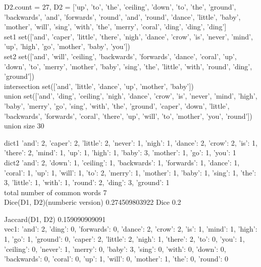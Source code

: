 \documentclass{article}
\begin{document}
D2.count = 27, D2 = ['up', 'to', 'the', 'ceiling', 'down', 'to', 'the', 'ground', 'backwards', 'and', 'forwards', 'round', 'and', 'round', 'dance', 'little', 'baby', 'mother', 'will', 'sing', 'with', 'the', 'merry', 'coral', 'ding', 'ding', 'ding'] \\

set1 set(['and', 'caper', 'little', 'there', 'nigh', 'dance', 'crow', 'is', 'never', 'mind', 'up', 'high', 'go', 'mother', 'baby', 'you']) \\

set2 set(['and', 'will', 'ceiling', 'backwards', 'forwards', 'dance', 'coral', 'up', 'down', 'to', 'merry', 'mother', 'baby', 'sing', 'the', 'little', 'with', 'round', 'ding', 'ground']) \\

intersection set(['and', 'little', 'dance', 'up', 'mother', 'baby']) \\

union set(['and', 'ding', 'ceiling', 'nigh', 'dance', 'crow', 'is', 'never', 'mind', 'high', 'baby', 'merry', 'go', 'sing', 'with', 'the', 'ground', 'caper', 'down', 'little', 'backwards', 'forwards', 'coral', 'there', 'up', 'will', 'to', 'mother', 'you', 'round']) \\

union size 30

dict1 {'and': 2, 'caper': 2, 'little': 2, 'never': 1, 'nigh': 1, 'dance': 2, 'crow': 2, 'is': 1, 'there': 2, 'mind': 1, 'up': 1, 'high': 1, 'baby': 3, 'mother': 1, 'go': 1, 'you': 1} \\

dict2 {'and': 2, 'down': 1, 'ceiling': 1, 'backwards': 1, 'forwards': 1, 'dance': 1, 'coral': 1, 'up': 1, 'will': 1, 'to': 2, 'merry': 1, 'mother': 1, 'baby': 1, 'sing': 1, 'the': 3, 'little': 1, 'with': 1, 'round': 2, 'ding': 3, 'ground': 1} \\

total number of common words 7 \\

Dice(D1, D2)(numberic version) 0.274509803922
Dice 0.2

Jaccard(D1, D2) 0.159090909091 \\

vec1: {'and': 2, 'ding': 0, 'forwards': 0, 'dance': 2, 'crow': 2, 'is': 1, 'mind': 1, 'high': 1, 'go': 1, 'ground': 0, 'caper': 2, 'little': 2, 'nigh': 1, 'there': 2, 'to': 0, 'you': 1, 'ceiling': 0, 'never': 1, 'merry': 0, 'baby': 3, 'sing': 0, 'with': 0, 'down': 0, 'backwards': 0, 'coral': 0, 'up': 1, 'will': 0, 'mother': 1, 'the': 0, 'round': 0} \\
\end{document}
